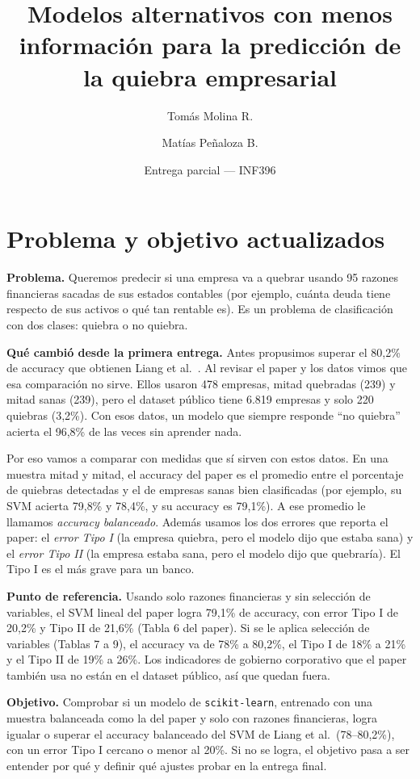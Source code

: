 \documentclass[11pt,a4paper]{article}
\title{Modelos alternativos con menos informaci\'on para la predicci\'on de la quiebra empresarial}
\author{Tom\'as Molina R. \and Mat\'ias Pe\~naloza B.}
\date{Entrega parcial --- INF396}
\begin{document}
\maketitle

\section{Problema y objetivo actualizados}

\textbf{Problema.} Queremos predecir si una empresa va a quebrar usando 95 razones financieras sacadas de sus estados contables (por ejemplo, cuánta deuda tiene respecto de sus activos o qué tan rentable es). Es un problema de clasificación con dos clases: quiebra o no quiebra.

\textbf{Qué cambió desde la primera entrega.} Antes propusimos superar el 80{,}2\% de accuracy que obtienen Liang et al.\ \citep{liang2016}. Al revisar el paper y los datos vimos que esa comparación no sirve. Ellos usaron 478 empresas, mitad quebradas (239) y mitad sanas (239), pero el dataset público \citep{uci572} tiene 6.819 empresas y solo 220 quiebras (3{,}2\%). Con esos datos, un modelo que siempre responde ``no quiebra'' acierta el 96{,}8\% de las veces sin aprender nada.

Por eso vamos a comparar con medidas que sí sirven con estos datos. En una muestra mitad y mitad, el accuracy del paper es el promedio entre el porcentaje de quiebras detectadas y el de empresas sanas bien clasificadas (por ejemplo, su SVM acierta 79{,}8\% y 78{,}4\%, y su accuracy es 79{,}1\%). A ese promedio le llamamos \emph{accuracy balanceado}. Además usamos los dos errores que reporta el paper: el \emph{error Tipo I} (la empresa quiebra, pero el modelo dijo que estaba sana) y el \emph{error Tipo II} (la empresa estaba sana, pero el modelo dijo que quebraría). El Tipo I es el más grave para un banco.

\textbf{Punto de referencia.} Usando solo razones financieras y sin selección de variables, el SVM lineal del paper logra 79{,}1\% de accuracy, con error Tipo I de 20{,}2\% y Tipo II de 21{,}6\% (Tabla 6 del paper). Si se le aplica selección de variables (Tablas 7 a 9), el accuracy va de 78\% a 80{,}2\%, el Tipo I de 18\% a 21\% y el Tipo II de 19\% a 26\%. Los indicadores de gobierno corporativo que el paper también usa no están en el dataset público, así que quedan fuera.

\textbf{Objetivo.} Comprobar si un modelo de \texttt{scikit-learn}, entrenado con una muestra balanceada como la del paper y solo con razones financieras, logra igualar o superar el accuracy balanceado del SVM de Liang et al.\ (78--80{,}2\%), con un error Tipo I cercano o menor al 20\%. Si no se logra, el objetivo pasa a ser entender por qué y definir qué ajustes probar en la entrega final.
\end{document}

